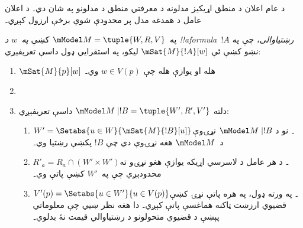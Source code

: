 \documentclass[../../../include/open-logic-section]{subfiles}
\begin{document}


د عام اعلان د منطق اړيکيز مدلونه د معرفتي منطق د مدلونو په شان
دي۔ د اعلان عامل د همدغه مدل پر محدودې شوې برخې ارزول کېږي۔

\begin{defn} په~$\mModel M = \tuple{W, R, V}$
  کښې \emph{په~$w$ د !!a{formula}~$!A$ رښتياوالی}، چې په نښو
  کښې ئې $\mSat{M}{!A}[w]$ ليکو، په استقرايي ډول داسې تعريفېږي:
  \begin{enumerate}
  \item $\mSat{M}{p}[w]$ هله او يوازې هله چې $w \in V(p)$ وي۔
  \item{}
  \item{}

  
  دلته $\mModel M \mid !B = \tuple{W', R', V'}$ داسې تعريفېږي:
  \begin{enumerate}
    \item $W' = \Setabs{ u \in W}{\mSat{M}{!B}[u]}$۔ نو د
      $\mModel M \mid !B$ نړۍوې د~$\mModel M$ هغه نړۍوې دي چې
      $!B$ پکښې رښتيا وي۔
    \item $R'_a = R_a \cap (W' \times W')$۔ د هر عامل د لاسرسي
      اړيکه يوازې هغو نړۍو ته محدودېږي چې په~$W'$ کښې پاتې وي۔
    \item $V'(p) = \Setabs{ u \in W'}{u \in V(p) }$۔ په ورته ډول،
      په هره پاتې نړۍ کښې قضيوي ارزښت ټاکنه هماغسې پاتې کېږي۔ دا هغه
      نظر ښيي چې معلوماتي پېښې د قضيوي متحولونو د رښتياوالي
      قيمت نۀ بدلوي۔
  \end{enumerate}
  
  \end{enumerate}
\end{defn}
\end{document}
